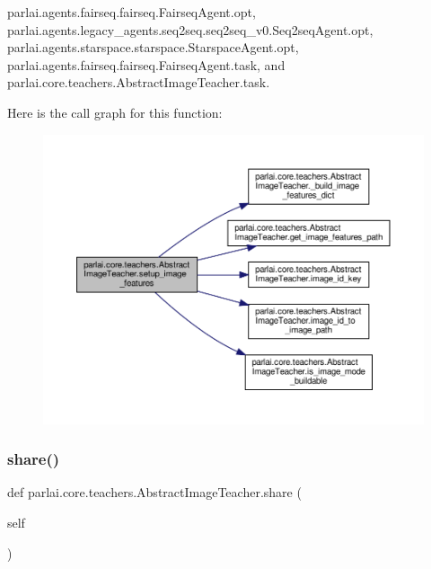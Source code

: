 parlai.\+agents.\+fairseq.\+fairseq.\+Fairseq\+Agent.\+opt, parlai.\+agents.\+legacy\+\_\+agents.\+seq2seq.\+seq2seq\+\_\+v0.\+Seq2seq\+Agent.\+opt, parlai.\+agents.\+starspace.\+starspace.\+Starspace\+Agent.\+opt, parlai.\+agents.\+fairseq.\+fairseq.\+Fairseq\+Agent.\+task, and parlai.\+core.\+teachers.\+Abstract\+Image\+Teacher.\+task.

Here is the call graph for this function\+:
\nopagebreak
\begin{figure}[H]
\begin{center}
\leavevmode
\includegraphics[width=350pt]{classparlai_1_1core_1_1teachers_1_1AbstractImageTeacher_aa6ac386d509d428870124c27265363bb_cgraph}
\end{center}
\end{figure}
\mbox{\label{classparlai_1_1core_1_1teachers_1_1AbstractImageTeacher_a6095f493a108e30fcf22d36c146cdb8e}} 
\subsubsection{\texorpdfstring{share()}{share()}}
{\footnotesize\ttfamily def parlai.\+core.\+teachers.\+Abstract\+Image\+Teacher.\+share (\begin{DoxyParamCaption}\item[{}]{self }\end{DoxyParamCaption})}



